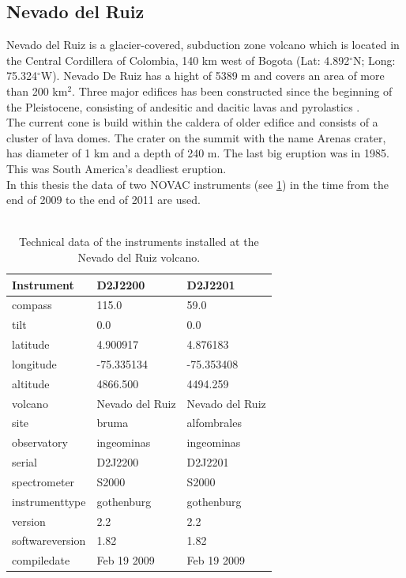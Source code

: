 \documentclass  [
  paper    = a4,
  BCOR     = 10mm,
  twoside,
  fontsize = 12pt,
  fleqn,
  toc      = bibnumbered,
  toc      = listofnumbered,
  numbers  = noendperiod,
  headings = normal,
  listof   = leveldown,
  version  = 3.03
]                                       {scrreprt}
\begin{document}
	\subsection*{Nevado del Ruiz}
	Nevado del Ruiz is a glacier-covered, subduction zone volcano which is located in the Central Cordillera of Colombia, 140 km west of Bogota
	(Lat: 4.892$^{\circ}$N; Long: 75.324$^{\circ}$W). Nevado De Ruiz has a hight of 5389 m and covers an area of more than 200 km$^2$.
	Three major edifices has been constructed since the beginning of the Pleistocene, consisting of andesitic and dacitic lavas and pyrolastics \citep{GlobalVolcanismProgram}. \\
	The current cone is build within the caldera of older edifice and consists of a cluster of lava domes. The crater on the summit with the name Arenas crater, has diameter of 1 km and a depth of 240 m. 
	The last big eruption was in 1985. This was South America's deadliest eruption.\\
	In this thesis the data of two NOVAC instruments (see \cref{tab:NVDRInstruments}) in the time from the end of 2009 to the end of 2011 are used. \\
	\\
	\begin{table}
		\centering
	\begin{tabular}{|p{4cm}|p{3cm}|p{3cm}|}
		Instrument	&D2J2200&D2J2201\\
		\toprule
		compass&115.0		&59.0		\\
		tilt&0.0		&0.0		\\
		latitude&4.900917		&4.876183		\\
		longitude&-75.335134		&-75.353408		\\
		altitude&4866.500		&4494.259		\\
		volcano&Nevado del Ruiz		&Nevado del Ruiz		\\
		site&bruma	&alfombrales\\
		observatory&ingeominas		&ingeominas		\\
		serial&D2J2200		&D2J2201		\\
		spectrometer&S2000		&S2000		\\	
		instrumenttype&gothenburg		&gothenburg		\\
		version&2.2		&2.2		\\
		softwareversion&1.82		&1.82		\\
		compiledate&Feb 19 2009		&Feb 19 2009		\\
		\bottomrule
	\end{tabular}
	\caption{Technical data of the instruments installed at the Nevado del Ruiz volcano.}
	\label{tab:NVDRInstruments}
\end{table}
\end{document}
